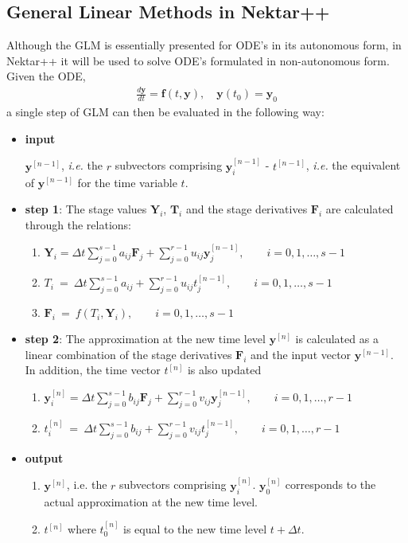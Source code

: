 \subsection{General Linear Methods in Nektar++}
Although the GLM is essentially presented for ODE's in its autonomous form, in
Nektar++ it will be used to solve ODE's formulated in non-autonomous form.
Given the ODE,
\begin{align*}
\frac{d\boldsymbol{y}}{dt}=\boldsymbol{f}(t,\boldsymbol{y}),\quad
\boldsymbol{y}(t_0)=\boldsymbol{y}_0
\end{align*}
a single step of GLM can then be evaluated in the following way:
\begin{itemize}
\item \textbf{input}

$\boldsymbol{y}^{[n-1]}$, \emph{i.e.} the $r$
    subvectors comprising $\boldsymbol{y}^{[n-1]}_i$ -
    $t^{[n-1]}$, \emph{i.e.} the equivalent of
    $\boldsymbol{y}^{[n-1]}$ for the time variable $t$.

\item \textbf{step 1}: The stage values $\boldsymbol{Y}_i$,
$\boldsymbol{T}_i$ and the stage derivatives
$\boldsymbol{F}_i$ are calculated through the relations:
\begin{enumerate}
\item $\boldsymbol{Y}_i = \Delta
    t\sum_{j=0}^{s-1}a_{ij}\boldsymbol{F}_j+\sum_{j=0}^{r-1}u_{ij}\boldsymbol{y}_{j}^{[n-1]},
    \qquad i=0,1,\ldots,s-1$
\item $T_i\ =\ \Delta
    t\sum_{j=0}^{s-1}a_{ij}+\sum_{j=0}^{r-1}u_{ij}t_{j}^{[n-1]}, \qquad
    i=0,1,\ldots,s-1$
\item $\boldsymbol{F}_i\ =\
    f(T_i,\boldsymbol{Y}_i), \qquad i=0,1,\ldots,s-1$
\end{enumerate}

\item \textbf{step 2}: The approximation at the new time level
$\boldsymbol{y}^{[n]}$ is calculated as a linear combination of the
stage derivatives $\boldsymbol{F}_i$ and the input vector
$\boldsymbol{y}^{[n-1]}$. In addition, the time vector
$t^{[n]}$ is also updated

\begin{enumerate}
\item $\boldsymbol{y}_{i}^{[n]} = \Delta
    t\sum_{j=0}^{s-1}b_{ij}\boldsymbol{F}_j+\sum_{j=0}^{r-1}v_{ij}\boldsymbol{y}_{j}^{[n-1]},
    \qquad i=0,1,\ldots,r-1$
\item $t_{i}^{[n]}\ =\ \Delta
    t\sum_{j=0}^{s-1}b_{ij}+\sum_{j=0}^{r-1}v_{ij}t_{j}^{[n-1]}, \qquad
    i=0,1,\ldots,r-1$
\end{enumerate}

\item \textbf{output}
\begin{enumerate}
\item $\boldsymbol{y}^{[n]}$, i.e. the $r$ subvectors
    comprising $\boldsymbol{y}^{[n]}_i$.
    $\boldsymbol{y}^{[n]}_0$ corresponds to the actual approximation
    at the new time level.
\item $t^{[n]}$ where $t^{[n]}_0$ is equal to the new time
    level $t+\Delta t$.
\end{enumerate}
\end{itemize}

